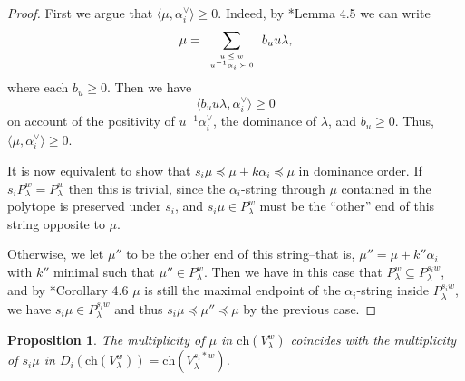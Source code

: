 \documentclass[12pt,reqno]{amsart}
\newtheorem{proposition}[theorem]{Proposition}
\theoremstyle{definition}
\begin{document}
\begin{proof}
First we argue that $\langle \mu, \alpha_i^\vee \rangle\ge 0$. Indeed, by \cite{BJK2}*{Lemma 4.5} we can write 
$$
\mu = \sum_{
\tiny \begin{array}{c}
u\le w \\
u^{-1}\alpha_i \succ 0
\end{array}
} b_u u\lambda,
$$
where each $b_u\ge 0$. Then we have 
$$
\langle b_u u\lambda, \alpha_i^\vee\rangle \ge 0
$$
on account of the positivity of $u^{-1}\alpha_i^\vee$, the dominance of $\lambda$, and $b_u\ge 0$. Thus, $\langle \mu, \alpha_i^\vee \rangle \geq 0$. 

It is now equivalent to show that $s_i\mu \preceq \mu + k\alpha_i \preceq \mu$ in dominance order. If $s_i P_\lambda^w = P_\lambda^w$ then this is trivial, since the $\alpha_i$-string through $\mu$ contained in the polytope is preserved under $s_i$, and $s_i\mu \in P^w_\lambda$ must be the ``other'' end of this string opposite to $\mu$. 

Otherwise, we let $\mu''$ to be the other end of this string--that is, $\mu'' = \mu+k''\alpha_i$ with $k''$ minimal such that $\mu'' \in P^w_\lambda$. Then we have in this case that $P^w_\lambda \subseteq P^{s_iw}_\lambda$, and by \cite{BJK2}*{Corollary 4.6} $\mu$ is still the maximal endpoint of the $\alpha_i$-string inside $P^{s_iw}_\lambda$,  we have $s_i\mu \in P^{s_iw}_\lambda$ and thus $s_i \mu \preceq \mu'' \preceq \mu$ by the previous case. 
\end{proof}







\begin{proposition} \label{MultProp}
The multiplicity of $\mu$ in $\mathrm{ch}(V_\lambda^w)$ coincides with the multiplicity of $s_i\mu$ in $D_{i}\left(\mathrm{ch}(V_\lambda^w)\right)=\mathrm{ch}(V_\lambda^{s_i \ast w})$. 
\end{proposition}
\end{document}
